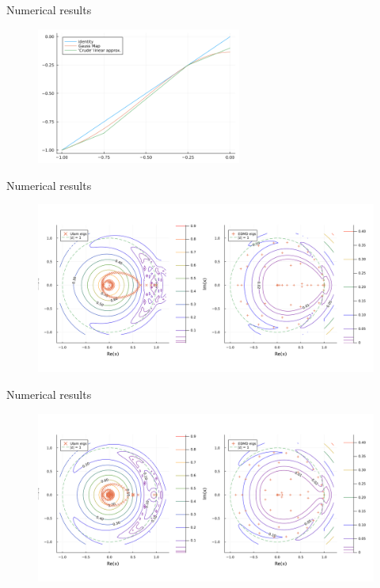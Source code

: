 \documentclass[
  english,            %
  aspectratio=169,    %
]{tumbeamer}
\begin{document}
\begin{frame}{Numerical results}

\begin{figure}
  \centering
  \includegraphics[width=0.6\textwidth]{maps.png}
\end{figure}
  
\end{frame}

\begin{frame}{Numerical results}

\begin{figure}
  \centering
  \includegraphics[width=\textwidth]{pseudospectrum_comparison_gauss.png}
\end{figure}
    
\end{frame}

\begin{frame}{Numerical results}

\begin{figure}
  \centering
  \includegraphics[width=\textwidth]{pseudospectrum_comparison_linear_gauss.png}
\end{figure}
  
\end{frame}
\end{document}
